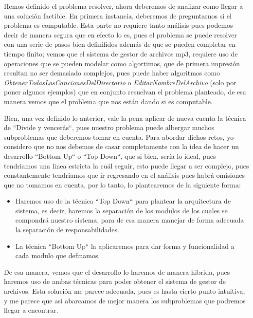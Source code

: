 \documentclass[10pt,letterpaper]{report}
\begin{document}
\noindent Hemos definido el problema resolver, ahora deberemos de analizar como llegar a una solución factible. En primera instancia, deberemos de preguntarnos si el problema es computable. Esta parte no requiere tanto análisis pues podemos decir de manera segura que en efecto lo es, pues el problema se puede resolver con una serie de pasos bien definifidos además de que se pueden completar en tiempo finito; vemos que el sistema de gestor de archivos mp3, requiere uso de operaciones que se pueden modelar como algortimos, que de primera impresión resultan no ser demasiado complejos, pues puede haber algoritmos como \textit{ObtenerTodasLasCancionesDelDirectorio} o \textit{EditarNombreDelArchivo} (solo por poner algunos ejemplos) que en conjunto resuelvan el problema planteado, de esa manera vemos que el problema que nos están dando si es computable.

\vspace{0.5cm}

\noindent Bien, una vez definido lo anterior, vale la pena aplicar de nueva cuenta la técnica de ``Divide y vencerás``, pues nuestro problema puede albergar muchos subproblemas que deberemos tomar en cuenta. Para abordar dichos retos, yo considero que no nos debemos de casar completamente con la idea de hacer un desarrollo ``Bottom Up`` o ``Top Down``, que si bien, sería lo ideal, pues tendriamos una linea estricta la cuál seguir, esto puede llegar a ser complejo, pues constantemente tendriamos que ir regresando en el análisis pues habrá omisiones que no tomamos en cuenta, por lo tanto, lo plantearemos de la siguiente forma:

\begin{itemize}
    \item Haremos uso de la técnica ``Top Down`` para plantear la arquitectura de sistema, es decir, haremos la separación de los modulos de los cuales se compondrá nuestro sistema, para de esa manera manejar de forma adecuada la separación de responsabilidades.
    \item La técnica ``Bottom Up`` la aplicaremos para dar forma y funcionalidad a cada modulo que definamos.
\end{itemize}

\noindent De esa manera, vemos que el desarrollo lo haremos de manera hibrida, pues haremos uso de ambas técnicas para poder obtener el sistema de gestor de archivos. Esta solución me parece adecuada, pues es hasta cierto punto intuitiva, y me parece que asi abarcamos de mejor manera los subproblemas que podremos llegar a encontrar. 
\end{document}
